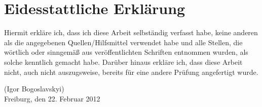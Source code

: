 
\chapter*{Eidesstattliche Erklärung}
\thispagestyle{empty}
\vspace{2cm}

Hiermit erkläre ich, dass ich diese Arbeit selbständig verfasst habe, keine anderen als die angegebenen Quellen/Hilfsmittel verwendet habe und alle Stellen, die wörtlich oder sinngemäß aus veröffentlichten Schriften entnommen wurden, als solche kenntlich gemacht habe. Darüber hinaus erkläre ich, dass diese Arbeit nicht, auch nicht auszugsweise, bereits für eine andere Prüfung angefertigt wurde.\\

\vspace{2cm}

\noindent (Igor Bogoslavskyi)\\
Freiburg, den 22. Februar 2012



